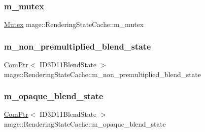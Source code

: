 \hypertarget{structmage_1_1_rendering_state_cache_a97aad58b39eedbeeb27ed47c87ded52a}{}\label{structmage_1_1_rendering_state_cache_a97aad58b39eedbeeb27ed47c87ded52a} 
\subsubsection{\texorpdfstring{m\+\_\+mutex}{m\_mutex}}
{\footnotesize\ttfamily \hyperlink{classmage_1_1_mutex}{Mutex} mage\+::\+Rendering\+State\+Cache\+::m\+\_\+mutex\hspace{0.3cm}{\ttfamily [private]}}

\hypertarget{structmage_1_1_rendering_state_cache_adaf1dd35ebb8e0ad9f2135ad0efee67a}{}\label{structmage_1_1_rendering_state_cache_adaf1dd35ebb8e0ad9f2135ad0efee67a} 
\subsubsection{\texorpdfstring{m\+\_\+non\+\_\+premultiplied\+\_\+blend\+\_\+state}{m\_non\_premultiplied\_blend\_state}}
{\footnotesize\ttfamily \hyperlink{namespacemage_ae74f374780900893caa5555d1031fd79}{Com\+Ptr}$<$ I\+D3\+D11\+Blend\+State $>$ mage\+::\+Rendering\+State\+Cache\+::m\+\_\+non\+\_\+premultiplied\+\_\+blend\+\_\+state\hspace{0.3cm}{\ttfamily [private]}}

\hypertarget{structmage_1_1_rendering_state_cache_ac655dae04386c2998677dff61704c975}{}\label{structmage_1_1_rendering_state_cache_ac655dae04386c2998677dff61704c975} 
\subsubsection{\texorpdfstring{m\+\_\+opaque\+\_\+blend\+\_\+state}{m\_opaque\_blend\_state}}
{\footnotesize\ttfamily \hyperlink{namespacemage_ae74f374780900893caa5555d1031fd79}{Com\+Ptr}$<$ I\+D3\+D11\+Blend\+State $>$ mage\+::\+Rendering\+State\+Cache\+::m\+\_\+opaque\+\_\+blend\+\_\+state\hspace{0.3cm}{\ttfamily [private]}}

